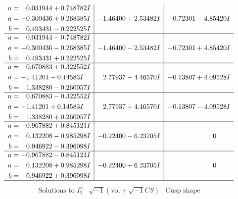 \documentclass[1p]{elsarticle_modified}
\theoremstyle{definition}
\newcommand{\I}{\sqrt{-1}}
\begin{document}
$$\begin{array}{c|c|c}
\begin{aligned}
u &= \phantom{-}0.031944 + 0.748782 I \\
a &= -0.300436 + 0.268385 I \\
b &= \phantom{-}0.493431 - 0.222525 I\end{aligned}
 & -1.46400 + 2.53482 I & -0.72301 - 4.85420 I \\ \hline\begin{aligned}
u &= \phantom{-}0.031944 - 0.748782 I \\
a &= -0.300436 - 0.268385 I \\
b &= \phantom{-}0.493431 + 0.222525 I\end{aligned}
 & -1.46400 - 2.53482 I & -0.72301 + 4.85420 I \\ \hline\begin{aligned}
u &= \phantom{-}0.670883 + 0.322552 I \\
a &= -1.41201 - 0.14583 I \\
b &= \phantom{-}1.338280 - 0.260057 I\end{aligned}
 & \phantom{-}2.77937 - 4.46570 I & -0.13807 + 4.09528 I \\ \hline\begin{aligned}
u &= \phantom{-}0.670883 - 0.322552 I \\
a &= -1.41201 + 0.14583 I \\
b &= \phantom{-}1.338280 + 0.260057 I\end{aligned}
 & \phantom{-}2.77937 + 4.46570 I & -0.13807 - 4.09528 I \\ \hline\begin{aligned}
u &= -0.967882 + 0.845121 I \\
a &= \phantom{-}0.132208 - 0.985298 I \\
b &= \phantom{-}0.946922 - 0.396098 I\end{aligned}
 & -0.22400 - 6.23705 I & \phantom{-0.000000 } 0 \\ \hline\begin{aligned}
u &= -0.967882 - 0.845121 I \\
a &= \phantom{-}0.132208 + 0.985298 I \\
b &= \phantom{-}0.946922 + 0.396098 I\end{aligned}
 & -0.22400 + 6.23705 I & \phantom{-0.000000 } 0\\
 \hline 
 \end{array}$$\newpage$$\begin{array}{c|c|c}  
\text{Solutions to }I^u_{2}& \I (\text{vol} + \sqrt{-1}CS) & \text{Cusp shape}\\
 \hline 
\begin{aligned}

\end{aligned}
\end{array}$$
\end{document}
